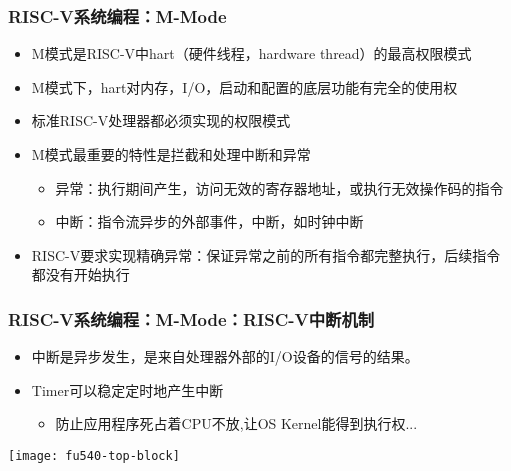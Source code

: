 \begin{frame}
    \frametitle{RISC-V系统编程：M-Mode}
    \begin{itemize}
        \item M模式是RISC-V中hart（硬件线程，hardware thread）的最高权限模式       
        \item M模式下，hart对内存，I/O，启动和配置的底层功能有完全的使用权
        \item 标准RISC-V处理器都必须实现的权限模式
        \item M模式最重要的特性是拦截和处理中断和异常
        \begin{itemize}
            \item 异常：执行期间产生，访问无效的寄存器地址，或执行无效操作码的指令
            \item 中断：指令流异步的外部事件，中断，如时钟中断
        \end{itemize}				
        \item RISC-V要求实现精确异常：保证异常之前的所有指令都完整执行，后续指令都没有开始执行
    \end{itemize}
    
\end{frame}


\begin{frame}[plain]
    \frametitle{RISC-V系统编程：M-Mode：RISC-V中断机制}
    \begin{itemize}
        \item 中断是异步发生，是来自处理器外部的I/O设备的信号的结果。
        
        
        \item Timer可以稳定定时地产生中断
        \begin{itemize}
            \item 防止应用程序死占着CPU不放,让OS Kernel能得到执行权...
        \end{itemize}				
        
    \end{itemize}
    
    \centering
    \texttt{[image: fu540-top-block]}
    
\end{frame}


